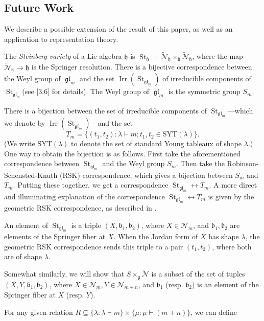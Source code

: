 \documentclass[12pt,psamsfonts]{article}
\DeclareMathOperator{\gl}{\mathfrak{gl}}
\DeclareMathOperator{\Irr}{Irr}
\DeclareMathOperator{\St}{St}
\begin{document}
\subsection{Future Work}
We describe a possible extension of the result of this paper, as well as an application to representation theory.
\par The \emph{Steinberg variety} of a Lie algebra \(\mathfrak{h}\) is \(\St_\mathfrak{h} = \widetilde{\mathcal{N}}_\mathfrak{h} \times_\mathfrak{h} \widetilde{\mathcal{N}}_\mathfrak{h}\), where the map \(\widetilde{\mathcal{N}}_\mathfrak{h} \to \mathfrak{h}\) is the Springer resolution.
There is a bijective correspondence between the Weyl group of \(\gl_m\) and the set \(\Irr(\St_{\gl_m})\) of irreducible components of \(\St_\mathfrak{\gl_m}\)(see \cite{ehf}[3.6] for details).
The Weyl group of \(\gl_m\) is the symmetric group \(S_m\).
\par There is a bijection between the set of irreducible components of \(\St_{\gl_m}\)---which we denote by \(\Irr(\St_{\gl_m})\)---and the set
\[T_m = \{(t_1, t_2) : \lambda \vdash m; t_1, t_2 \in \mathrm{SYT}(\lambda)\}.\]
(We write \(\mathrm{SYT}(\lambda)\) to denote the set of standard Young tableaux of shape \(\lambda\).)
One way to obtain the bijection is as follows.
First take the aforementioned correspondence between \(\St_{\gl_m}\) and the Weyl group \(S_m\).
Then take the Robinson-Schensted-Knuth (RSK) correspondence, which gives a bijection between \(S_m\) and \(T_m\).
Putting these together, we get a correspondence \(\St_{\gl_m} \leftrightarrow T_m\).
A more direct and illuminating explanation of the correspondence \(\St_{\gl_m} \leftrightarrow T_m\) is given by the geometric RSK correspondence, as described in \cite{geomRSK}.
\par An element of \(\St_{\gl_m}\) is a triple \((X, \mathfrak{b}_1, \mathfrak{b}_2)\), where \(X \in \mathcal{N}_m\), and \(\mathfrak{b}_1, \mathfrak{b}_2\) are elements of the Springer fiber at \(X\).
When the Jordan form of \(X\) has shape \(\lambda\), the geometric RSK correspondence sends this triple to a pair \((t_1, t_2)\), where both are of shape \(\lambda\).
\par Somewhat similarly, we will show that \(S \times_\mathfrak{g} \widetilde{\mathcal{N}}\) is a subset of the set of tuples \((X, Y, \mathfrak{b}_1, \mathfrak{b}_2)\), where \(X \in \mathcal{N}_m, Y \in \mathcal{N}_{m + n}\), and \(\mathfrak{b}_1\) (resp. \(\mathfrak{b}_2\)) is an element of the Springer fiber at \(X\) (resp. \(Y\)).
\par For any given relation \(R \subseteq \{\lambda : \lambda \vdash m\} \times \{\mu : \mu \vdash (m + n)\}\), we can define 
\end{document}
